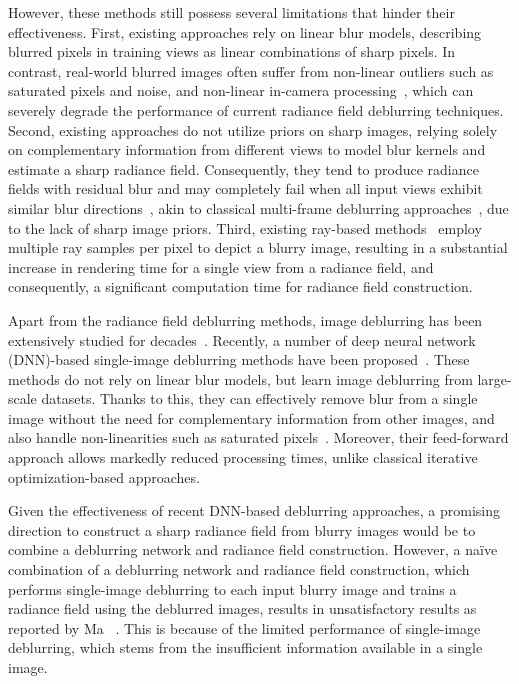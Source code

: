 However, these methods still possess several limitations that hinder their effectiveness.
First, existing approaches rely on linear blur models, describing blurred pixels in training views as linear combinations of sharp pixels.
In contrast, real-world blurred images often suffer from non-linear outliers such as saturated pixels and noise, and non-linear in-camera processing~\cite{cho2011handling_original,rim_2022_ECCV_original}, which can severely degrade the performance of current radiance field deblurring techniques.
Second, existing approaches do not utilize priors on sharp images, relying solely on complementary information from different views to model blur kernels and estimate a sharp radiance field. Consequently, they tend to produce radiance fields with residual blur and may completely fail when all input views exhibit similar blur directions~\cite{ma2022deblurnerf}, akin to classical multi-frame deblurring approaches~\cite{chen1996image,rav2005two,cho2007removing}, due to the lack of sharp image priors.
Third, existing ray-based methods~\cite{ma2022deblurnerf, wang2023badnerf, lee2023dpnerf, peng2023pdrf, lee2023exblurf} employ multiple ray samples per pixel to depict a blurry image, resulting in a substantial increase in rendering time for a single view from a radiance field, and consequently, a significant computation time for radiance field construction.

Apart from the radiance field deblurring methods, image deblurring has been extensively studied for decades~\cite{cho2009fast, hirsch2011fast, zhang2013non, pan2014deblurring, whyte10nonuniform}.
Recently, a number of deep neural network (DNN)-based single-image deblurring methods have been proposed~\cite{nah2017gopro, tao2018srn, kupyn2018deblurgan, zamir2021mprnet, cho2021mimounet, chen2022nafnet}.
These methods do not rely on linear blur models, but learn image deblurring from large-scale datasets.
Thanks to this, they can effectively remove blur from a single image without the need for complementary information from other images, and also handle non-linearities such as saturated pixels~\cite{rim2020realblur}.
Moreover, their feed-forward approach allows markedly reduced processing times, unlike classical iterative optimization-based approaches.

Given the effectiveness of recent DNN-based deblurring approaches, a promising direction to construct a sharp radiance field from blurry images would be to combine a deblurring network and radiance field construction.
However, a na\"ive combination of a deblurring network and radiance field construction, which performs single-image deblurring to each input blurry image and trains a radiance field using the deblurred images, results in unsatisfactory results as reported by Ma \etal~\cite{ma2022deblurnerf}.
This is because of the limited performance of single-image deblurring, which stems from the insufficient information available in a single image.


